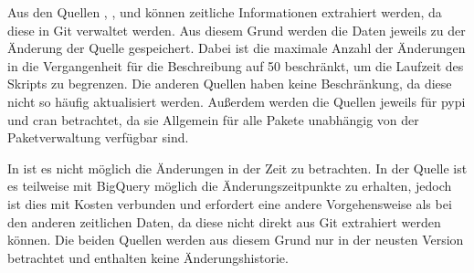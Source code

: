 Aus den Quellen , ,  und  können zeitliche Informationen extrahiert werden, da diese in Git verwaltet werden.
Aus diesem Grund werden die Daten jeweils zu der Änderung der Quelle gespeichert.
Dabei ist die maximale Anzahl der Änderungen in die Vergangenheit für die Beschreibung auf 50 beschränkt, um die Laufzeit des Skripts zu begrenzen.
Die anderen Quellen haben keine Beschränkung, da diese nicht so häufig aktualisiert werden.
Außerdem werden die Quellen jeweils für \gls{pypi} und \gls{cran} betrachtet, da sie Allgemein für alle Pakete unabhängig von der Paketverwaltung verfügbar sind.

In  ist es nicht möglich die Änderungen in der Zeit zu betrachten.
In der  Quelle ist es teilweise mit BigQuery möglich die Änderungszeitpunkte zu erhalten, jedoch ist dies mit Kosten verbunden und erfordert eine andere Vorgehensweise als bei den anderen zeitlichen Daten, da diese nicht direkt aus Git extrahiert werden können.
Die beiden Quellen werden aus diesem Grund nur in der neusten Version betrachtet und enthalten keine Änderungshistorie.







